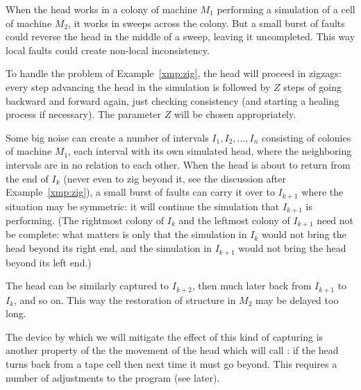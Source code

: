 \documentclass[11pt]{memoir}
\theoremstyle{definition} %
\newcommand{\Z}{Z} %
\begin{document}
\begin{example}\label{xmp:zig}
  When the head works in a colony of machine \( M_{1} \)
  performing a simulation of a cell of machine \( M_{2} \), it works in sweeps across the colony.
  But a small burst of faults could reverse the head in the middle of a sweep, leaving it uncompleted.
  This way local faults could create non-local inconsistency.
\end{example}

To handle the problem of Example~\ref{xmp:zig}, the head will proceed in zigzags: every
  step advancing the head in the simulation
  is followed by \( \Z \) steps of going backward and forward again, just checking consistency
  (and starting a healing process if necessary).
  The parameter \( \Z \) will be chosen appropriately.

\begin{example}\label{xmp:feather}
  Some big noise can create a number of intervals \( I_{1},I_{2},\dots,I_{n} \)
  consisting of colonies of machine \( M_{1} \), each interval with its own simulated head,
  where the neighboring intervals are in no relation to each other.
  When the head is about to return from the end of \( I_{k} \)
  (never even to zig beyond it, see the discussion after Example~\ref{xmp:zig}),
  a small burst of faults can carry it over to \( I_{k+1} \) where
  the situation may be symmetric: it will continue the simulation that \( I_{k+1} \) is performing.
  (The rightmost colony of \( I_{k} \) and the leftmost colony of \( I_{k+1} \) need not be complete:
  what matters is only that the simulation in \( I_{k} \) would not bring the head beyond its right end,
  and the simulation in \( I_{k+1} \) would not bring the head beyond its left end.)

  The head can be similarly captured to \( I_{k+2} \), then much later back from \( I_{k+1} \) to \( I_{k} \),
  and so on.
  This way the restoration of structure in \( M_{2} \) may be delayed too long.
\end{example}

The device by which we will mitigate the effect of this kind of capturing is another property of the
the movement of the head which will call :
if the head turns back from a tape cell then next time it must go beyond.
This requires a number of adjustments to the program (see later).
\end{document}
